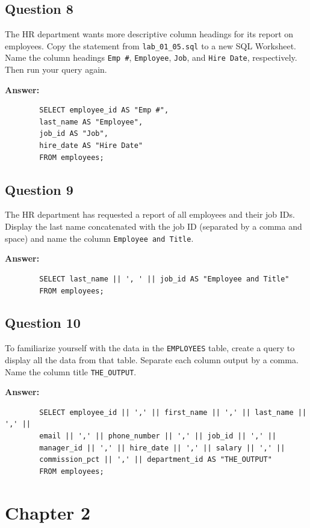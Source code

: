\documentclass[12pt,a4paper]{article}
\begin{document}
\subsection*{Question 8}
The HR department wants more descriptive column headings for its report on employees. 
Copy the statement from \texttt{lab\_01\_05.sql} to a new SQL Worksheet. Name the column headings 
\texttt{Emp \#}, \texttt{Employee}, \texttt{Job}, and \texttt{Hire Date}, respectively. Then run your query again.

\textbf{Answer:}
    \begin{lstlisting}
        SELECT employee_id AS "Emp #",
        last_name AS "Employee",
        job_id AS "Job",
        hire_date AS "Hire Date"
        FROM employees;
    \end{lstlisting}

\newpage
\subsection*{Question 9}
The HR department has requested a report of all employees and their job IDs. Display the last 
name concatenated with the job ID (separated by a comma and space) and name the column 
\texttt{Employee and Title}.

\textbf{Answer:}
    \begin{lstlisting}
        SELECT last_name || ', ' || job_id AS "Employee and Title"
        FROM employees;
    \end{lstlisting}

\subsection*{Question 10}
To familiarize yourself with the data in the \texttt{EMPLOYEES} table, create a query to display all the 
data from that table. Separate each column output by a comma. Name the column title 
\texttt{THE\_OUTPUT}.

\textbf{Answer:}
    \begin{lstlisting}
        SELECT employee_id || ',' || first_name || ',' || last_name || ',' ||
        email || ',' || phone_number || ',' || job_id || ',' ||
        manager_id || ',' || hire_date || ',' || salary || ',' ||
        commission_pct || ',' || department_id AS "THE_OUTPUT"
        FROM employees;
    \end{lstlisting}

\section*{Chapter 2}
\end{document}
